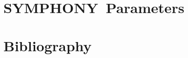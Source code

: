 \documentclass[twoside,11pt]{book}
\newcommand{\BB}{{\sc SYMPHONY}}
\begin{document}







%

%

%

%

%

%


\newpage

\section{\BB\ Parameters}
\label{params}


\newpage

\section{Bibliography}




%
\end{document}
